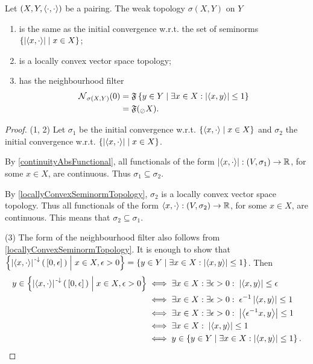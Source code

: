 \begin{lemma} \label{weakTopologyLCTVS}
Let $\left( X,Y,\left\langle \cdot,\cdot \right\rangle \right)$ be a pairing. The weak topology $\sigma(X,Y)$ on $Y$ 
\begin{enumerate}
\item is the same as the initial convergence w.r.t. the set of seminorms $\left\{ \left|\left\langle x,\cdot \right\rangle\right| \;\middle|\; x\in X \right\}$;
\item is a locally convex vector space topology;
\item has the neighbourhood filter
\begin{align*}
\operatorname{\mathcal{N}}_{\sigma(X,Y)}(0) &= \mathfrak{F}\left\{ y\in Y \;\middle|\; \exists x\in X: \left|\left\langle x,y \right\rangle\right| \leq 1 \right\} \\
&= \mathfrak{F}(_\oslash{X}).
\end{align*}
\end{enumerate}
\end{lemma}
\begin{proof}
(1, 2) Let $\sigma_1$ be the initial convergence w.r.t. $\left\{ \left\langle x,\cdot \right\rangle \;\middle|\; x\in X \right\}$ and $\sigma_2$ the initial convergence w.r.t. $\left\{ \left|\left\langle x,\cdot \right\rangle\right| \;\middle|\; x\in X \right\}$.

By \ref{continuityAbsFunctional}, all functionals of the form $\left|\left\langle x,\cdot \right\rangle\right|: \left( V,\sigma_1 \right) \to \mathbb{R}$, for some $x\in X$, are continuous. Thus $\sigma_1 \subseteq \sigma_2$.

By \ref{locallyConvexSeminormTopology}, $\sigma_2$ is a locally convex vector space topology. Thus all functionals of the form $\left\langle x,\cdot \right\rangle: \left( V,\sigma_2 \right) \to \mathbb{R}$, for some $x\in X$, are continuous. This means that $\sigma_2 \subseteq \sigma_1$.

(3) The form of the neighbourhood filter also follows from \ref{locallyConvexSeminormTopology}. It is enough to show that $\left\{ \left|\left\langle x,\cdot \right\rangle\right|^{{\text{\hspace{0.15em}-}\downarrow}}(\,[0,\epsilon]\,) \;\middle|\; x\in X, \epsilon > 0 \right\} = \left\{ y\in Y \;\middle|\; \exists x\in X: \left|\left\langle x,y \right\rangle\right| \leq 1 \right\}$. Then
\begin{align*}
y \in \left\{ \left|\left\langle x,\cdot \right\rangle\right|^{{\text{\hspace{0.15em}-}\downarrow}}(\,[0,\epsilon]\,) \;\middle|\; x\in X, \epsilon > 0 \right\} &\iff \exists x\in X: \exists \epsilon > 0: \; \left|\left\langle x,y \right\rangle\right| \leq \epsilon \\
&\iff \exists x\in X: \exists \epsilon > 0: \; \epsilon^{-1}\left|\left\langle x,y \right\rangle\right| \leq 1 \\
&\iff \exists x\in X: \exists \epsilon > 0: \; \left|\left\langle \epsilon^{-1}x,y \right\rangle\right| \leq 1 \\
&\iff \exists x\in X: \; \left|\left\langle x,y \right\rangle\right| \leq 1 \\
&\iff y\in \left\{ y\in Y \;\middle|\; \exists x\in X: \left|\left\langle x,y \right\rangle\right| \leq 1 \right\}.
\end{align*}
\end{proof}

